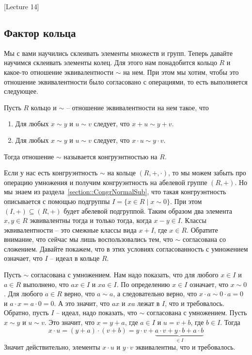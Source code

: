 [Lecture 14]


\subsection{Фактор кольца}
\label{section::QuotientRing}

Мы с вами научились склеивать элементы множеств и групп.
Теперь давайте научимся склеивать элементы колец.
Для этого нам понадобится кольцо $R$ и какое-то отношение эквивалентности $\sim$ на нем.
При этом мы хотим, чтобы это отношение эквивалентности было согласовано с операциями, то есть выполняется следующее.

\begin{definition}
\label{def::RingCongruence}
Пусть $R$ кольцо и $\sim$ -- отношение эквивалентности на нем такое, что
\begin{enumerate}
\item Для любых $x\sim y$ и $u \sim v$ следует, что $x + u \sim y + v$.

\item Для любых $x\sim y$ и $u\sim v$ следует, что $x \cdot u \sim y \cdot v$.
\end{enumerate}
Тогда отношение $\sim$ называется конгруэнтностью на $R$.
\end{definition}

Если у нас есть конгруэнтность $\sim$ на кольце $(R, +, \cdot)$, то мы можем забыть про операцию умножения и получим конгруэнтность на абелевой группе $(R, +)$.
Но мы знаем из раздела~\ref{section::CongrNormalSub}, что такая конгруэнтность описывается с помощью подгруппы $I = \{ x\in R \mid x \sim 0\}$.
При этом $(I, +) \subseteq (R, +)$ будет абелевой подгруппой.
Таким образом два элемента $x,y\in R$ эквивалентны тогда и только тогда, когда $x - y \in I$.
Классы эквивалентности -- это смежные классы вида $x + I$, где $x\in R$.
Обратите внимание, что сейчас мы лишь воспользовались тем, что $\sim$ согласована со сложением.
Давайте покажем, что в этих условиях согласованность с умножением означает, что $I$ -- идеал в кольце $R$.

Пусть $\sim$ согласована с умножением.
Нам надо показать, что для любого $x\in I$ и $a\in R$ выполнено, что $ax\in I$ и $xa\in I$.
По определению $x\in I$ означает, что $x\sim 0$.
Для любого $a\in R$ верно, что $a\sim a$, а следовательно верно, что $x \cdot a \sim 0 \cdot a = 0$ и $a \cdot x = a \cdot 0  = 0$.
А это значит, что $ax$ и $xa$ лежат в $I$, что и требовалось.
Обратно, пусть $I$ -- идеал, надо показать, что $\sim$ согласована с умножением.
Пусть $x\sim y$ и $u\sim v$.
Это значит, что $x = y + a$, где $a\in I$ и $u = v + b$, где $b \in I$.
Тогда
\[
x\cdot u = (y + a) \cdot ( v + b) = y \cdot v + \underbrace{a \cdot v + y \cdot b + a \cdot b}_{\in I}
\]
Значит действительно, элементы $x\cdot u $ и $y\cdot v$ эквивалентны, что и требовалось.

